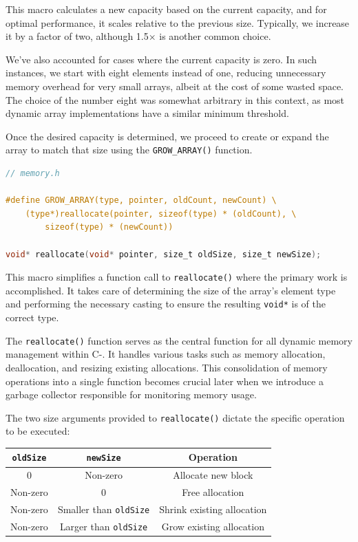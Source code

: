 This macro calculates a new capacity based on the current capacity, and for optimal performance, it scales relative to the previous size. Typically, we increase it by a factor of two, although 1.5× is another common choice.

We've also accounted for cases where the current capacity is zero. In such instances, we start with eight elements instead of one, reducing unnecessary memory overhead for very small arrays, albeit at the cost of some wasted space. The choice of the number eight was somewhat arbitrary in this context, as most dynamic array implementations have a similar minimum threshold. 

Once the desired capacity is determined, we proceed to create or expand the array to match that size using the \verb+GROW_ARRAY()+ function.

\begin{lstlisting}[language=C]
// memory.h

#define GROW_ARRAY(type, pointer, oldCount, newCount) \
    (type*)reallocate(pointer, sizeof(type) * (oldCount), \
        sizeof(type) * (newCount))

void* reallocate(void* pointer, size_t oldSize, size_t newSize);
\end{lstlisting}

This macro simplifies a function call to \verb.reallocate(). where the primary work is accomplished. It takes care of determining the size of the array's element type and performing the necessary casting to ensure the resulting \verb+void*+ is of the correct type.

The \verb.reallocate(). function serves as the central function for all dynamic memory management within C-. It handles various tasks such as memory allocation, deallocation, and resizing existing allocations. This consolidation of memory operations into a single function becomes crucial later when we introduce a garbage collector responsible for monitoring memory usage.

The two size arguments provided to \verb.reallocate(). dictate the specific operation to be executed:


\begin{table}[h]
{\centering
\begin{tabular}{|c|c|c|}
\hline
\rowcolor[HTML]{EFEFEF} 
\verb.oldSize. & \verb.newSize.              & Operation                  \\ \hline
0              & Non-zero                    & Allocate new block         \\ \hline
Non-zero       & 0                           & Free allocation            \\ \hline
Non-zero       & Smaller than \verb.oldSize. & Shrink existing allocation \\ \hline
Non-zero       & Larger than \verb.oldSize.  & Grow existing allocation   \\ \hline
\end{tabular} \par}
\end{table}

